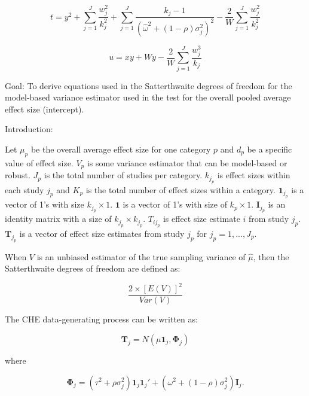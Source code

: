\begin{equation}
    t = y^2 + \sum_{j=1}^J \frac{w^2_j}{k_j^2} + \sum_{j=1}^J \frac{k_j -1}{(\hat{\omega}^2 + (1-\rho)\sigma^2_j )^2} - \frac{2}{W}\sum_{j=1}^J \frac{w^2_j}{k_j^2}
\end{equation}
    
\begin{equation}
    u = xy + Wy - \frac{2}{W}\sum_{j=1}^J\frac{w_j^3}{k_j}
\end{equation}

Goal: To derive equations used in the Satterthwaite degrees of freedom for the model-based variance estimator used in the test for the overall pooled average effect size (intercept). 

Introduction: 

Let $\mu_p$ be the overall average effect size for one category $p$ and $d_p$ be a specific value of effect size. $V_p$ is some variance estimator that can be model-based or robust. $J_p$ is the total number of studies per category. $k_{j_p}$ is effect sizes within each study $j_p$ and $K_p$ is the total number of effect sizes within a category. $\textbf{1}_{j_p}$  is a vector of 1's with size $k_{j_p} \times 1$. $ \textbf{1}$ is a vector of 1's with size of $k_p \times 1$. $\textbf{I}_{j_p}$ is an identity matrix with a size of $k_{j_p} \times k_{j_p}$. $T_{ij_p}$ is effect size estimate $i$ from study $j_p$. $\textbf{T}_{j_p}$ is a vector of effect size estimates from study $j_p$ for $j_p=1,...,J_p$.  





When $V$ is an unbiased estimator of the true sampling variance of $\hat{\mu}$, then the Satterthwaite degrees of freedom are defined as:

\begin{equation}
    \frac{2 \times [E(V)]^2}{Var(V)}
\end{equation}


The CHE data-generating process can be written as:

\begin{equation}
    \mathbf{T}_j = N(\mu\mathbf{1}_j, \mathbf{\Phi}_j)
\end{equation}

where 

\begin{equation}
    \mathbf{\Phi}_j = (\tau^2 + \rho\sigma_j^2)\mathbf{1}_j\textbf{1}_j' + (\omega^2 + (1-\rho)\sigma^2_j)\mathbf{I}_j.
\end{equation}

